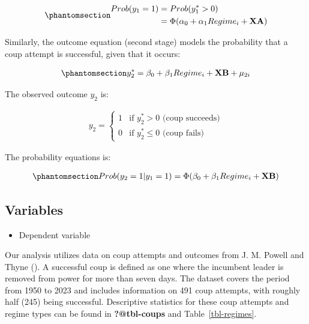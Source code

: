 \documentclass[
  12pt,
]{report}
\providecommand{\tightlist}{%
  \setlength{\itemsep}{0pt}\setlength{\parskip}{0pt}}\usepackage{longtable,booktabs,array}
\begin{document}
\begin{equation}\phantomsection\label{eq-eq4a}{
\begin{aligned}
Prob(y_1 =1)&=Prob(y_{1}^*>0) \\
&=\Phi(\alpha_0 + \alpha_1 Regime_i + \mathbf{XA})
\end{aligned}
}\end{equation}

Similarly, the outcome equation (second stage) models the probability
that a coup attempt is successful, given that it occurs:

\begin{equation}\phantomsection\label{eq-eq5}{
\begin{aligned}
y_2^*=\beta_0 + \beta_1 Regime_i + \mathbf {XB} + \mu_{2i}
\end{aligned}
}\end{equation}

The observed outcome \(y_2\) is:

\[
\begin{aligned}
y_2 = 
\begin{cases} 
1 &\text{if $y_2^*>0$ (coup succeeds)} \\
0 &\text{if $y_2^*\le0$ (coup fails)}
\end{cases}
\end{aligned}
\]

The probability equations is:

\begin{equation}\phantomsection\label{eq-eq5a}{
\begin{aligned}
Prob(y_2=1|y_1 =1)=\Phi(\beta_0 + \beta_1 Regime_i + \mathbf{XB})
\end{aligned}
}\end{equation}

\subsection{Variables}\label{variables}

\begin{itemize}
\tightlist
\item
  Dependent variable
\end{itemize}

Our analysis utilizes data on coup attempts and outcomes from J. M.
Powell and Thyne (). A successful coup is
defined as one where the incumbent leader is removed from power for more
than seven days. The dataset covers the period from 1950 to 2023 and
includes information on 491 coup attempts, with roughly half (245) being
successful. Descriptive statistics for these coup attempts and regime
types can be found in \textbf{?@tbl-coups} and Table~\ref{tbl-regimes}.
\end{document}
